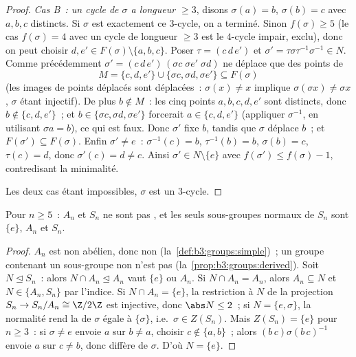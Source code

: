 \begin{proof}
\emph{Cas B~: un cycle de $\sigma$ a longueur $\geq 3$}, disons
$\sigma(a) = b$, $\sigma(b) = c$ avec $a, b, c$ distincts. Si
$\sigma$ est exactement ce $3$-cycle, on a terminé. Sinon
$f(\sigma) \geq 5$ (le cas $f(\sigma) = 4$ avec un cycle de
longueur $\geq 3$ est le $4$-cycle impair, exclu), donc on peut
choisir $d, e' \in F(\sigma) \setminus \{a, b, c\}$. Poser $\tau
= (c\,d\,e')$ et $\sigma' = \tau\sigma\tau^{-1}\sigma^{-1} \in N$.
Comme précédemment $\sigma' = (c\,d\,e')\,(\sigma c\;\sigma
e'\;\sigma d)$ ne déplace que des points de
\[
M = \{c, d, e'\} \cup \{\sigma c, \sigma d, \sigma e'\}
\subseteq F(\sigma)
\]
(les images de points déplacés sont déplacées~: $\sigma(x) \ne x$
implique $\sigma(\sigma x) \neq \sigma x$, $\sigma$ étant
injectif). De plus $b \notin M$~: les cinq points $a, b, c, d,
e'$ sont distincts, donc $b \notin \{c, d, e'\}$~; et $b \in
\{\sigma c, \sigma d, \sigma e'\}$ forcerait $a \in \{c, d, e'\}$
(appliquer $\sigma^{-1}$, en utilisant $\sigma a = b$), ce qui
est faux. Donc $\sigma'$ fixe $b$, tandis que $\sigma$ déplace
$b$~; et $F(\sigma') \subseteq F(\sigma)$. Enfin $\sigma' \neq
e$~: $\sigma^{-1}(c) = b$, $\tau^{-1}(b) = b$, $\sigma(b) = c$,
$\tau(c) = d$, donc $\sigma'(c) = d \neq c$. Ainsi $\sigma' \in N
\setminus \{e\}$ avec $f(\sigma') \leq f(\sigma) - 1$,
contredisant la minimalité.

Les deux cas étant impossibles, $\sigma$ est un $3$-cycle.
\end{proof}

\begin{corollary}\label{cor:b3:groups:snnotsolvable}
Pour $n \geq 5$~: $A_n$ et $S_n$ ne sont pas , et les
seuls sous-groupes normaux de $S_n$ sont $\{e\}$, $A_n$ et $S_n$.
\end{corollary}

\begin{proof}
$A_n$ est  non abélien, donc non 
(la~\cref{def:b3:groups:simple})~; un groupe contenant un
sous-groupe non  n'est pas 
(la~\cref{prop:b3:groups:derived}). Soit $N \trianglelefteq
S_n$~: alors $N \cap A_n \trianglelefteq A_n$ vaut $\{e\}$ ou
$A_n$. Si $N \cap A_n = A_n$, alors $A_n \subseteq N$ et $N \in
\{A_n, S_n\}$ par l'indice. Si $N \cap A_n = \{e\}$, la
restriction à $N$ de la projection $S_n \to S_n/A_n \cong
\Z/2\Z$ est injective, donc $\abs N \leq 2$~; si $N = \{e,
\sigma\}$, la normalité rend la  de $\sigma$
égale à $\{\sigma\}$, i.e.\ $\sigma \in Z(S_n)$. Mais $Z(S_n) =
\{e\}$ pour $n \geq 3$~: si $\sigma \ne e$ envoie $a$ sur $b \neq
a$, choisir $c \notin \{a, b\}$~; alors
$(b\,c)\sigma(b\,c)^{-1}$ envoie $a$ sur $c \ne b$, donc diffère
de $\sigma$. D'où $N = \{e\}$.
\end{proof}

